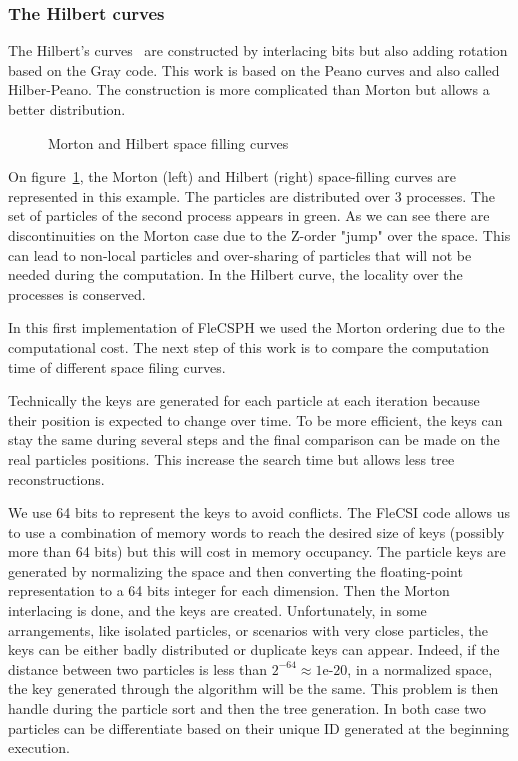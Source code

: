 \subsubsection*{The Hilbert curves} The Hilbert's curves~\cite{sagan2012space} are constructed by interlacing bits but also adding rotation based on the Gray code.
This work is based on the Peano curves and also called Hilber-Peano. 
The construction is more complicated than Morton but allows a better distribution. 

\begin{figure}[t!]
\centering

\caption{Morton and Hilbert space filling curves}
\label{fig:space_filling}
\end{figure}

On figure~\ref{fig:space_filling}, the Morton (left) and Hilbert (right) space-filling curves are represented in this example.
The particles are distributed over 3 processes. 
The set of particles of the second process appears in green. 
As we can see there are discontinuities on the Morton case due to the Z-order "jump" over the space. 
This can lead to non-local particles and over-sharing of particles that will not be needed during the computation.
In the Hilbert curve, the locality over the processes is conserved.

In this first implementation of FleCSPH we used the Morton ordering due to the computational cost. 
The next step of this work is to compare the computation time of different space filing curves. 

Technically the keys are generated for each particle at each iteration because their position is expected to change over time. 
To be more efficient, the keys can stay the same during several steps and the final comparison can be made on the real particles positions. 
This increase the search time but allows less tree reconstructions.

We use 64 bits to represent the keys to avoid conflicts.
The FleCSI code allows us to use a combination of memory words to reach the desired size of keys (possibly more than 64 bits) but this will cost in memory occupancy. 
The particle keys are generated by normalizing the space and then converting the floating-point representation to a 64 bits integer for each dimension. 
Then the Morton interlacing is done, and the keys are created. 
Unfortunately, in some arrangements, like isolated particles, or scenarios with very close particles, the keys can be either badly distributed or duplicate keys can appear. 
Indeed, if the distance between two particles is less than $2^{-64} \approx 1$e-$20$, in a normalized space, the key generated through the algorithm will be the same. 
This problem is then handle during the particle sort and then the tree generation. 
In both case two particles can be differentiate based on their unique ID generated at the beginning execution. 

